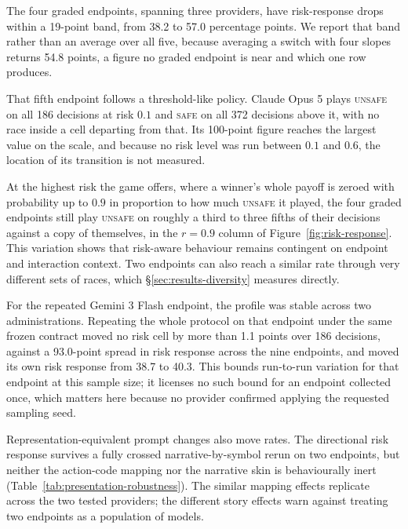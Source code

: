 \documentclass[sigconf,anonymous]{aamas}
\newcommand{\Safe}{\textsc{safe}}
\newcommand{\Unsafe}{\textsc{unsafe}}
\begin{document}
The four graded endpoints, spanning three providers, have risk-response drops within
a 19-point band, from 38.2 to 57.0 percentage points. We report that band
rather than an average over all five, because averaging a switch with four
slopes returns 54.8 points, a figure no graded endpoint is near and which one row
produces.

That fifth endpoint follows a threshold-like policy. Claude Opus 5 plays \Unsafe{}
on all 186 decisions at risk $0.1$ and \Safe{} on all 372 decisions above it,
with no race inside a cell departing from that. Its 100-point figure reaches
the largest value on the scale, and because no risk level was run between
$0.1$ and $0.6$, the location of its transition is not measured.

At the highest risk the game offers, where a winner's whole payoff is zeroed
with probability up to $0.9$ in proportion to how much \Unsafe{} it played, the
four graded endpoints still play \Unsafe{} on roughly a third to three fifths of
their decisions against a copy of themselves, in the $r{=}0.9$ column of
Figure~\ref{fig:risk-response}. This variation shows that risk-aware behaviour
remains contingent on endpoint and interaction context. Two endpoints
can also reach a similar rate through very different sets of races, which
\S\ref{sec:results-diversity} measures directly.

For the repeated Gemini 3 Flash endpoint, the profile was stable across two
administrations. Repeating the whole protocol on that endpoint under the same frozen
contract moved no risk cell by more than 1.1 points over 186 decisions, against
a 93.0-point spread in risk response across the nine endpoints, and moved its own
risk response from 38.7 to 40.3. This bounds run-to-run variation for that endpoint
at this sample size; it licenses no such bound for an endpoint collected once, which
matters here because no provider confirmed applying the requested sampling seed.

Representation-equivalent prompt changes also move rates. The directional risk
response survives a fully crossed narrative-by-symbol rerun on two endpoints,
but neither the action-code mapping nor the narrative skin is behaviourally
inert (Table~\ref{tab:presentation-robustness}). The similar mapping effects
replicate across the two tested providers; the different story effects warn
against treating two endpoints as a population of models.
\end{document}
